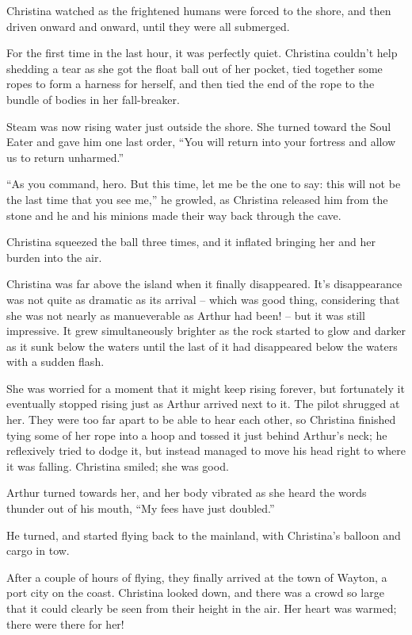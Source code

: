 \documentclass[showtrims,b6paper,draft,10pt]{memoir}
\begin{document}
Christina watched as the frightened humans were forced to the shore, and then driven onward and onward, until they were all submerged.

For the first time in the last hour, it was perfectly quiet.  Christina couldn't help shedding a tear as she got the float ball out of her pocket, tied together some ropes to form a harness for herself, and then tied the end of the rope to the bundle of bodies in her fall-breaker.

Steam was now rising water just outside the shore.  She turned toward the Soul Eater and gave him one last order, ``You will return into your fortress and allow us to return unharmed.''

``As you command, hero.  But this time, let me be the one to say:  this will not be the last time that you see me,'' he growled, as Christina released him from the stone and he and his minions made their way back through the cave.

Christina squeezed the ball three times, and it inflated bringing her and her burden into the air.

\timeskip

Christina was far above the island when it finally disappeared.  It's disappearance was not quite as dramatic as its arrival -- which was good thing, considering that she was not nearly as manueverable as Arthur had been! -- but it was still impressive.  It grew simultaneously brighter as the rock started to glow and darker as it sunk below the waters until the last of it had disappeared below the waters with a sudden flash.

She was worried for a moment that it might keep rising forever, but fortunately it eventually stopped rising just as Arthur arrived next to it.  The pilot shrugged at her.  They were too far apart to be able to hear each other, so Christina finished tying some of her rope into a hoop and tossed it just behind Arthur's neck;  he reflexively tried to dodge it, but instead managed to move his head right to where it was falling.  Christina smiled;  she was good.

Arthur turned towards her, and her body vibrated as she heard the words thunder out of his mouth, ``My fees have just doubled.''

He turned, and started flying back to the mainland, with Christina's balloon and cargo in tow.

After a couple of hours of flying, they finally arrived at the town of Wayton, a port city on the coast.  Christina looked down, and there was a crowd so large that it could clearly be seen from their height in the air.  Her heart was warmed;  there were there for her!
\end{document}
